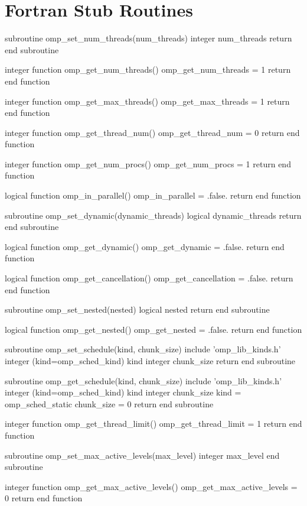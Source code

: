 \section{Fortran Stub Routines}
\label{sec:Fortran Stub Routines}
{\small \begin{codepar}
subroutine omp\_set\_num\_threads(num\_threads)
  integer num\_threads
  return
end subroutine

integer function omp\_get\_num\_threads()
  omp\_get\_num\_threads = 1
  return
end function

integer function omp\_get\_max\_threads()
  omp\_get\_max\_threads = 1
  return
end function

integer function omp\_get\_thread\_num()
  omp\_get\_thread\_num = 0
  return
end function

integer function omp\_get\_num\_procs()
  omp\_get\_num\_procs = 1
  return
end function

logical function omp\_in\_parallel()
  omp\_in\_parallel = .false.
  return
end function

subroutine omp\_set\_dynamic(dynamic\_threads)
  logical dynamic\_threads
  return
end subroutine

logical function omp\_get\_dynamic()
  omp\_get\_dynamic = .false.
  return
end function

logical function omp\_get\_cancellation()
  omp\_get\_cancellation = .false.
  return
end function

subroutine omp\_set\_nested(nested)
  logical nested
  return
end subroutine

logical function omp\_get\_nested()
  omp\_get\_nested = .false.
  return
end function

subroutine omp\_set\_schedule(kind, chunk\_size)
  include 'omp\_lib\_kinds.h'
  integer (kind=omp\_sched\_kind) kind
  integer chunk\_size
  return
end subroutine

subroutine omp\_get\_schedule(kind, chunk\_size)
  include 'omp\_lib\_kinds.h'
  integer (kind=omp\_sched\_kind) kind
  integer chunk\_size
  kind = omp\_sched\_static
  chunk\_size = 0
  return
end subroutine

integer function omp\_get\_thread\_limit()
  omp\_get\_thread\_limit = 1
  return
end function

subroutine omp\_set\_max\_active\_levels(max\_level)
  integer max\_level
end subroutine

integer function omp\_get\_max\_active\_levels()
  omp\_get\_max\_active\_levels = 0
  return
end function


\end{codepar}}
